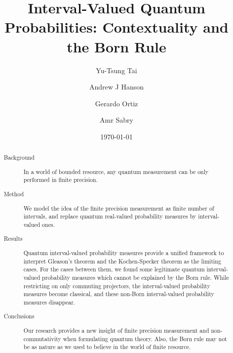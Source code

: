 \documentclass[english,reprint, aps, prl,superscriptaddress, showpacs,
showkeys, longbibliography, amsmath, amssymb]{revtex4-1}
\theoremstyle{plain}
\theoremstyle{definition}
\begin{document}
\title{Interval-Valued Quantum Probabilities: Contextuality and the Born Rule}

\author{Yu-Tsung Tai}

\author{Andrew J Hanson}

\author{Gerardo Ortiz}

\author{Amr Sabry}

\date{\today}

\begin{abstract}
\begin{description}
\item [{Background}] In a world of bounded resource, any quantum measurement
can be only performed in finite precision.
\item [{Method}] We model the idea of the finite precision measurement
as finite number of intervals, and replace quantum real-valued probability
measures by interval-valued ones.
\item [{Results}] Quantum interval-valued probability measures provide
a unified framework to interpret Gleason's theorem and the Kochen-Specker
theorem as the limiting cases. For the cases between them, we found
some legitimate quantum interval-valued probability measures which
cannot be explained by the Born rule. While restricting on only commuting
projectors, the interval-valued probability measures become classical,
and these non-Born interval-valued probability measures disappear.
\item [{Conclusions}] Our research provides a new insight of finite precision
measurement and non-commutativity when formulating quantum theory.
Also, the Born rule may not be as nature as we used to believe in
the world of finite resource.
\end{description}
\end{abstract}


\end{document}
